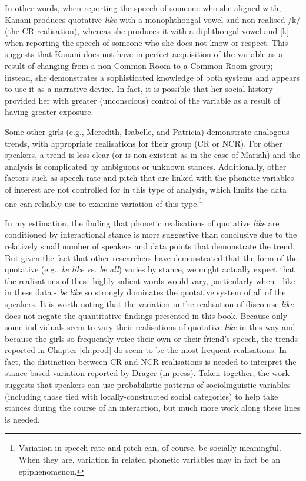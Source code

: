 In other words, when reporting the speech of someone who she aligned with, Kanani produces quotative \textit{like} with a monophthongal vowel and non-realised /k/ (the CR realisation), whereas she produces it with a diphthongal vowel and [k] when reporting the speech of someone who she does not know or respect.  This suggests that Kanani does not have imperfect acquisition of the variable as a result of changing from a non-Common Room to a Common Room group; instead, she demonstrates a sophisticated knowledge of both systems and appears to use it as a narrative device. In fact, it is possible that her social history provided her with greater (unconscious) control of the variable as a result of having greater exposure.

Some other girls (e.g., Meredith, Isabelle, and Patricia) demonstrate analogous trends, with appropriate realisations for their group (CR or NCR).  For other speakers, a trend is less clear (or is non-existent as in the case of Mariah) and the analysis is complicated by ambiguous or unknown stances.  Additionally, other factors such as speech rate and pitch that are linked with the phonetic variables of interest are not controlled for in this type of analysis, which limits the data one can reliably use to examine variation of this type.\footnote{Variation in speech rate and pitch can, of course, be socially meaningful.  When they are, variation in related phonetic variables may in fact be an epiphenomenon.}  

In my estimation, the finding that phonetic realisations of quotative \textit{like} are conditioned by interactional stance is more suggestive than conclusive due to the relatively small number of speakers and data points that demonstrate the trend. But given the fact that other researchers have demonstrated that the form of the quotative (e.g., \textit{be like} vs. \textit{be all}) varies by stance, we might actually expect that the realisations of these highly salient words would vary, particularly when - like in these data - \textit{be like} so strongly dominates the quotative system of all of the speakers.  It is worth noting that the variation in the realisation of discourse \textit{like} does not negate the quantitative findings presented in this book.  Because only some individuals seem to vary their realisations of quotative \textit{like} in this way and because the girls so frequently voice their own or their friend's speech, the trends reported in Chapter \ref{ch:prod} do seem to be the most frequent realisations.  In fact, the distinction between CR and NCR realisations is needed to interpret the stance-based variation reported by Drager (in press).  Taken together, the work suggests that speakers can use probabilistic patterns of sociolinguistic variables (including those tied with locally-constructed social categories) to help take stances during the course of an interaction, but much more work along these lines is needed.




